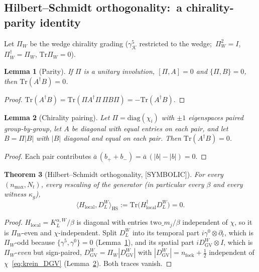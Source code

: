 \documentclass[11pt,a4paper]{article}
\theoremstyle{plain}
\newtheorem{theorem}{Theorem}[section]
\newtheorem{lemma}[theorem]{Lemma}
\theoremstyle{definition}
\newcommand{\nmax}{n_{\max}}
\newcommand{\Tr}{\mathrm{Tr}}
\newcommand{\Krein}{\mathcal{K}}
\newcommand{\Nt}{N_t}
\newcommand{\DGV}{D_{\mathrm{GV}}}
\newcommand{\DL}{D_{L}}
\newcommand{\KL}{K_{L}}
\begin{document}
\subsection{Hilbert--Schmidt orthogonality:\ a chirality-parity identity}
\label{sec:pythagorean_orthogonality}

Let $\Pi_W$ be the wedge chirality grading ($\gamma^5_{\Krein}$ restricted
to the wedge;\ $\Pi_W^2 = I$, $\Pi_W^\dagger = \Pi_W$, $\Tr\Pi_W = 0$).

\begin{lemma}[Parity]\label{lem:parity_HS}
If $\Pi$ is a unitary involution, $[\Pi, A] = 0$ and $\{\Pi, B\} = 0$,
then $\Tr(A^\dagger B) = 0$.
\end{lemma}

\begin{proof}
$\Tr(A^\dagger B) = \Tr(\Pi A^\dagger\Pi\,\Pi B\Pi) = -\Tr(A^\dagger B)$.
\end{proof}

\begin{lemma}[Chirality pairing]\label{lem:pairing_HS}
Let $\Pi = \mathrm{diag}(\chi_i)$ with $\pm1$ eigenspaces paired
group-by-group, let $A$ be diagonal with equal entries on each pair, and
let $B = \Pi|B|$ with $|B|$ diagonal and equal on each pair.  Then
$\Tr(A^\dagger B) = 0$.
\end{lemma}

\begin{proof}
Each pair contributes $\bar a\,(b_+ + b_-) = \bar a\,(|b| - |b|) = 0$.
\end{proof}

\begin{theorem}[Hilbert--Schmidt orthogonality, {[SYMBOLIC]}]
\label{thm:pythagorean_formal}
For every $(\nmax, \Nt)$, every rescaling of the generator (in
particular every $\beta$ and every witness $\kappa_g$),
\[
   \big\langle H_{\mathrm{local}}, \DL^W\big\rangle_{\mathrm{HS}}
   := \Tr\big(H_{\mathrm{local}}^\dagger\DL^W\big) = 0.
\]
\end{theorem}

\begin{proof}
$H_{\mathrm{local}} = \KL^{\alpha, W}/\beta$ is diagonal with entries
$\mathrm{two}\_m_j/\beta$ independent of $\chi$, so it is $\Pi_W$-even and
$\chi$-independent.  Split $\DL^W$ into its temporal part
$i\gamma^0\otimes\partial_t$, which is $\Pi_W$-odd because
$\{\gamma^5, \gamma^0\} = 0$ (Lemma~\ref{lem:parity_HS}), and its spatial
part $i\DGV^W\otimes I$, which is $\Pi_W$-\emph{even} but sign-paired,
$\DGV^W = \Pi_W|\DGV^W|$ with $|\DGV^W| = n_{\mathrm{fock}} + \tfrac12$
independent of $\chi$~\eqref{eq:krein_DGV} (Lemma~\ref{lem:pairing_HS}).
Both traces vanish.
\end{proof}
\end{document}
